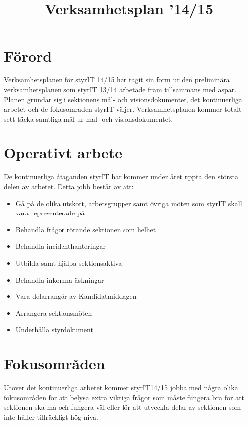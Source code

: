 \documentclass[11pt, includeaddress]{../../classes/cthit}
\begin{document}
\title{Verksamhetsplan \STYRITFULL{}'14/15}
\maketitle

\thispagestyle{empty}

\newpage

\makeheadfoot%

\setcounter{tocdepth}{2}
\setcounter{page}{1}
\tableofcontents

\newpage

\section{Förord}
Verksamhetsplanen för styrIT 14/15 har tagit sin form ur den preliminära verksamhetsplanen som styrIT 13/14 arbetade fram tillsammans med aspar. Planen grundar sig i sektionens mål- och visionsdokumentet, det kontinuerliga arbetet och de fokusområden styrIT väljer. Verksamhetsplanen kommer totalt sett täcka samtliga mål ur mål- och visionsdokumentet.


\section{Operativt arbete}
De kontinuerliga åtaganden styrIT har kommer under året uppta den största delen av arbetet. Detta jobb består av att:
\begin{itemize}
	\item Gå på de olika utskott, arbetsgrupper samt övriga möten som styrIT skall vara representerade på
	\item Behandla frågor rörande sektionen som helhet
	\item Behandla incidenthanteringar
	\item Utbilda samt hjälpa sektionsaktiva
	\item Behandla inkomna äskningar
	\item Vara delarrangör av Kandidatmiddagen
	\item Arrangera sektionsmöten
	\item Underhålla styrdokument
\end{itemize}

\section{Fokusområden}
Utöver det kontinuerliga arbetet kommer styrIT14/15 jobba med några olika fokusområden för att belysa extra viktiga frågor som måste fungera bra för att sektionen ska må och fungera väl eller för att utveckla delar av sektionen som inte håller tillräckligt hög nivå.
\end{document}
